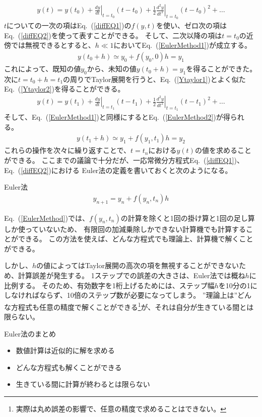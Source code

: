 \documentclass[autodetect-engine,dvipdfmx-if-dvi,ja=standard,a4paper,layout=v2]{bxjsreport}
\newcommand{\eref}[1]{Eq.~(\ref{#1})}
\begin{document}
    \begin{align}
      y(t) = y(t_0) + \left.\frac{dy}{dt}\right|_{t=t_0}\!(t-t_0) 
      + \frac{1}{2}\left.\frac{d^2y}{dt^2}\right|_{t=t_0}\!(t-t_0)^2 + \dots\label{Ytaylor1}
    \end{align}
    $t$についての一次の項は\eref{diffEQ1}の$f(y,t)$を使い、ゼロ次の項は\eref{diffEQ2}を使って表すことができる。
    そして、二次以降の項は$t=t_0$の近傍では無視できるとすると、$h \ll 1$において\eref{EulerMethod1}が成立する。
    \begin{align}
      y(t_0 + h) \simeq y_0 + f(y_0,0)h = y_1 \label{EulerMethod1} 
    \end{align}
    これによって、既知の値$y_0$から、未知の値$y(t_0 + h)=y_1$を得ることができた。
    次に$t=t_0 + h = t_1$の周りでTaylor展開を行うと、\eref{Ytaylor1}とよく似た\eref{Ytaylor2}を得ることができる。
    \begin{align}
      y(t) = y(t_1) + \left.\frac{dy}{dt}\right|_{t=t_1}\!(t-t_1) 
      + \frac{1}{2}\left.\frac{d^2y}{dt^2}\right|_{t=t_1}\!(t-t_1)^2 + \dots\label{Ytaylor2}
    \end{align}
    そして、\eref{EulerMethod1}と同様にすると\eref{EulerMethod2}が得られる。
    \begin{align}
      y(t_1 + h) \simeq y_1 + f(y_1,t_1)h = y_2\label{EulerMethod2} 
    \end{align}
    これらの操作を次々に繰り返すことで、$t=t_n$における$y(t)$の値を求めることができる。
    ここまでの議論で十分だが、一応常微分方程式\eref{diffEQ1}、\eref{diffEQ2}における
    Euler法の定義を書いておくと次のようになる。
    \begin{itembox}[l]{Euler法}
      \begin{align}
        y_{n+1} = y_n + f(y_n,t_n)h\label{EulerMethod}
      \end{align}
    \end{itembox}
    \eref{EulerMethod}では、$f(y_n,t_n)$の計算を除くと1回の掛け算と1回の足し算しか使っていないため、
    有限回の加減乗除しかできない計算機でも計算することができる。
    この方法を使えば、どんな方程式でも理論上、計算機で解くことができる。\par
    しかし、$h$の値によってはTaylor展開の高次の項を無視することができないため、計算誤差が発生する。
    1ステップでの誤差の大きさは、Euler法では概ね$h$に比例する。
    そのため、有効数字を1桁上げるためには、ステップ幅$h$を10分の1にしなければならず、10倍のステップ数が必要になってしまう。
    ”理論上は”どんな方程式も任意の精度で解くことができる\footnote{
      実際は丸め誤差の影響で、任意の精度で求めることはできない。
    }が、それは自分が生きている間とは限らない。
    \begin{itembox}[l]{Euler法のまとめ}
      \begin{itemize}
          \item 数値計算は近似的に解を求める
          \item どんな方程式も解くことができる
          \item 生きている間に計算が終わるとは限らない
      \end{itemize}
    \end{itembox}
\end{document}
